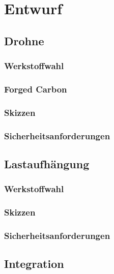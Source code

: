 \chapter{Entwurf}

\section{Drohne}
\subsection{Werkstoffwahl}
\subsection{Forged Carbon}
\subsection{Skizzen}
\subsection{Sicherheitsanforderungen}


\section{Lastaufhängung}
\subsection{Werkstoffwahl}
\subsection{Skizzen}
\subsection{Sicherheitsanforderungen}


\section{Integration}

